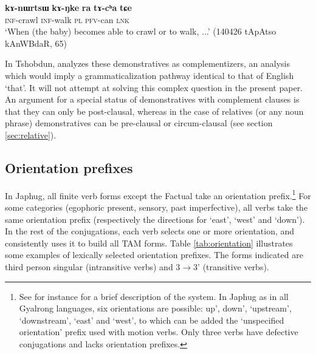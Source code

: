 \documentclass[oneside,a4paper,11pt]{article}
\newcommand{\ipa}[1]{\textbf{\phon#1}} %
\begin{document}
 \begin{exe}
\ex \label{ex:kANke.ra}
\gll   \ipa{kɤ-nɯrtsɯ} 	\ipa{kɤ-ŋke} 	\ipa{ra} 	\ipa{tɤ-cʰa} 	\ipa{tɕe}   \\
  \textsc{inf}-crawl   \textsc{inf}-walk \textsc{pl} \textsc{pfv}-can \textsc{lnk} \\
\glt `When (the baby) becomes able to crawl or to walk, ...'  (140426 tApAtso kAnWBdaR, 65)
\end{exe}

In Tshobdun, \citet[481]{sun12complementation} analyzes these demonstratives as complementizers, an analysis which would imply a grammaticalization pathway identical to that of English `that'. It will not attempt  at solving this complex question in the present paper. An argument for a special status of demonstratives with complement clauses is that they can only be post-clausal, whereas in the case of relatives (or any noun phrase) demonstratives can be pre-clausal or circum-clausal (see section \ref{sec:relative}).

\subsection{Orientation prefixes} \label{sec:raising}
In Japhug, all finite verb forms except the Factual take an orientation prefix.\footnote{See for instance \citealt[265-9]{jacques14linking} for a  brief description of the system. In Japhug as in all Gyalrong languages, six orientations are possible:  up',  down', `upstream', `downstream', `east' and `west', to which can be added the `unspecified orientation' prefix used with motion verbs. Only three verbs have defective conjugations and lacks orientation prefixes.} For some categories (egophoric present, sensory, past imperfective), all verbs take the same orientation prefix (respectively the directions for `east', `west' and `down'). In the rest of the conjugations, each verb selects one or more orientation, and consistently uses it to build all TAM forms. Table \ref{tab:orientation} illustrates some examples of lexically selected orientation prefixes. The forms indicated are third person singular (intransitive verbs) and 3$\rightarrow$3' (transitive verbs).
\end{document}
